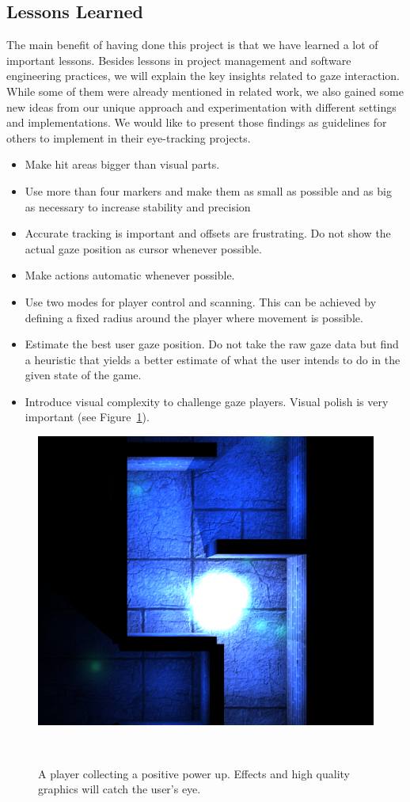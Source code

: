 \documentclass{sigchi}
\begin{document}
\subsection{Lessons Learned}
The main benefit of having done this project is that we have learned a lot of important lessons. Besides lessons in project management and software engineering practices, we will explain the key insights related to gaze interaction. While some of them were already mentioned in related work, we also gained some new ideas from our unique approach and experimentation with different settings and implementations. We would like to present those findings as guidelines for others to implement in their eye-tracking projects.
 \begin{itemize}
\item Make hit areas bigger than visual parts.
\item Use more than four markers and make them as small as possible and as big as necessary to increase stability and precision
\item Accurate tracking is important and offsets are frustrating. Do not show the actual gaze position as cursor whenever possible.
\item Make actions automatic whenever possible.
\item Use two modes for player control and scanning. This can be achieved by defining a fixed radius around the player where movement is possible.
\item Estimate the best user gaze position. Do not take the raw gaze data but find a heuristic that yields a better estimate of what the user intends to do in the given state of the game.
\item Introduce visual complexity to challenge gaze players. Visual polish is very important  (see Figure~\ref{fig:figure5}).
\end{itemize}
\begin{figure}
\centering
  \includegraphics[width=0.9\columnwidth]{figures/visuals}
  \caption{A player collecting a positive power up. Effects and high quality graphics will catch the user's eye.}~\label{fig:figure5}
\end{figure}
\end{document}
